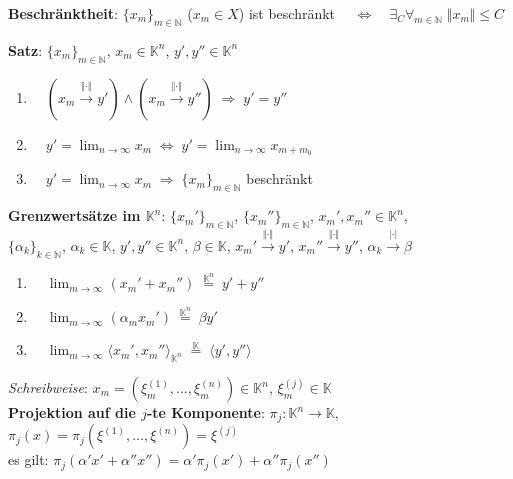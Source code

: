 \textbf{Beschränktheit}:
$\{x_m\}_{m \in \mathbb{N}}$ ($x_m \in X$) ist beschränkt
$\quad\Leftrightarrow\quad \exists_{C} \forall_{m \in \mathbb{N}}\;
\Vert x_m \Vert \le C$

\linie
\pagebreak

\textbf{Satz}: \quad
$\{x_m\}_{m \in \mathbb{N}}$, $x_m \in \mathbb{K}^n$,
$y', y'' \in \mathbb{K}^n$

\begin{enumerate}
    \item $\quad (x_m \xrightarrow{\Vert \cdot \Vert} y') \land
    (x_m \xrightarrow{\Vert \cdot \Vert} y'') \;\Rightarrow\; y' = y''$

    \item $\quad y' = \lim_{n \to \infty} x_m \;\Leftrightarrow\;
    y' = \lim_{n \to \infty} x_{m + m_0}$

    \item $\quad y' = \lim_{n \to \infty} x_m \;\Rightarrow\;
    \{x_m\}_{m \in \mathbb{N}}$ beschränkt
\end{enumerate}

\textbf{Grenzwertsätze im $\mathbb{K}^n$}: \quad
$\{x_m'\}_{m \in \mathbb{N}}$, $\{x_m''\}_{m \in \mathbb{N}}$,
$x_m', x_m'' \in \mathbb{K}^n$, \\
$\{\alpha_k\}_{k \in \mathbb{N}}$,
$\alpha_k \in \mathbb{K}$, \quad
$y', y'' \in \mathbb{K}^n$,
$\beta \in \mathbb{K}$, \quad
$x_m' \xrightarrow{\Vert \cdot \Vert} y'$,
$x_m'' \xrightarrow{\Vert \cdot \Vert} y''$,
$\alpha_k \xrightarrow{|\cdot|} \beta$

\begin{enumerate}
    \item $\quad \lim_{m \to \infty} (x_m' + x_m'')
    \;\overset{\mathbb{K}^n}{=}\; y' + y''$

    \item $\quad \lim_{m \to \infty} (\alpha_m x_m')
    \;\overset{\mathbb{K}^n}{=}\; \beta y'$

    \item $\quad \lim_{m \to \infty}
    \langle x_m', x_m'' \rangle_{\mathbb{K}^n}
    \;\overset{\mathbb{K}}{=}\; \langle y', y'' \rangle$
\end{enumerate}

\linie

\emph{Schreibweise}:
$x_m = (\xi_m^{(1)}, \ldots, \xi_m^{(n)}) \in \mathbb{K}^n$,
$\xi_m^{(j)} \in \mathbb{K}$ \\
\textbf{Projektion auf die $j$-te Komponente}:
$\pi_j: \mathbb{K}^n \rightarrow \mathbb{K}$,
$\pi_j(x) = \pi_j(\xi^{(1)}, \ldots, \xi^{(n)}) = \xi^{(j)}$ \\
es gilt:
$\pi_j(\alpha'x' + \alpha''x'') = \alpha'\pi_j(x') + \alpha''\pi_j(x'')$

